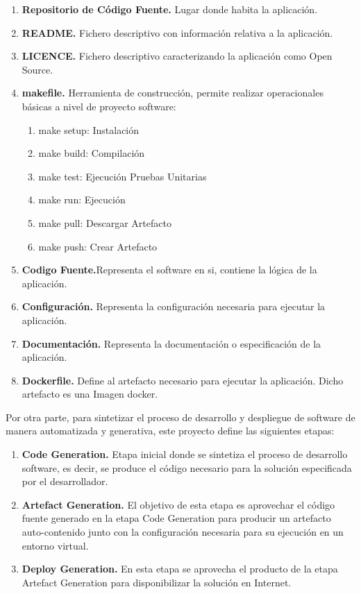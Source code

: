 \documentclass[a4paper,11pt]{book}
\begin{document}
\begin{enumerate}
\item \textbf{ Repositorio de Código Fuente. } Lugar donde habita la aplicación. 
\item \textbf{ README.} Fichero descriptivo con información relativa a  la aplicación. 
\item \textbf{ LICENCE. }Fichero descriptivo caracterizando la aplicación como Open Source. 
\item \textbf{ makefile.} Herramienta  de construcción, permite realizar operacionales básicas a nivel de proyecto software:

  \begin{enumerate}[label*=\arabic*.]
    \item make setup:  Instalación
    \item make build:  Compilación
    \item make test: Ejecución Pruebas Unitarias
   	\item make run: Ejecución
   	\item make pull: Descargar Artefacto
   	\item make push: Crear Artefacto	
  \end{enumerate}
  
  
\item \textbf{ Codigo Fuente.}Representa el software en si, contiene la lógica de la aplicación.  
\item \textbf{ Configuración.} Representa la configuración necesaria para ejecutar la aplicación. 
\item \textbf{ Documentación.} Representa la documentación o especificación de la aplicación. 
\item \textbf{ Dockerfile.} Define al artefacto necesario para ejecutar la aplicación. Dicho artefacto es una Imagen docker. 
\end{enumerate}




Por otra parte, para sintetizar el proceso de desarrollo y despliegue de software de manera automatizada y generativa, este proyecto define las siguientes etapas: 

\begin{enumerate}
\item \textbf{ Code Generation. }  Etapa inicial donde se sintetiza el proceso de desarrollo software, es decir, se produce el código necesario para la solución especificada por el desarrollador.
\item \textbf{ Artefact Generation. }  El objetivo de esta etapa es aprovechar el código fuente generado en la etapa Code Generation para producir un artefacto auto-contenido junto con la configuración necesaria para su ejecución en un entorno virtual.
\item \textbf{ Deploy Generation. } En esta etapa se aprovecha el producto de la etapa Artefact Generation para disponibilizar la solución en Internet.
\end{enumerate}
\end{document}
